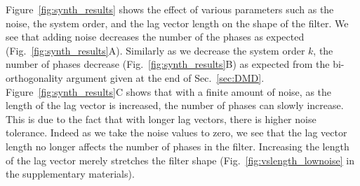 \documentclass[%
 reprint,
 amsmath,amssymb,
 aps,
]{revtex4-2}
\begin{document}

Figure~\ref{fig:synth_results} shows the effect of various parameters such as the noise, the system order, and the lag vector length on the shape of the filter. We see that adding noise decreases the number of the phases as expected (Fig.~\ref{fig:synth_results}A). Similarly as we decrease the system order $k$, the number of phases decrease  (Fig.~\ref{fig:synth_results}B) as expected from the bi-orthogonality argument given at the end of Sec.~\ref{sec:DMD}.  Figure~\ref{fig:synth_results}C shows that with a finite amount of noise, as the length of the lag vector is increased, the number of phases can slowly increase. This is due to the fact that with longer lag vectors, there is higher noise tolerance. Indeed as we take the noise values to zero, we see that the lag vector length no longer affects the number of phases in the filter. Increasing the length of the lag vector merely stretches the filter shape (Fig.~\ref{fig:vslength_lownoise} in the supplementary materials).
\end{document}
